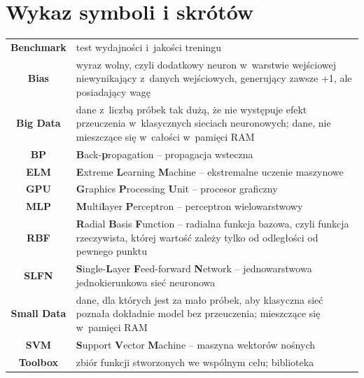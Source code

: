 \documentclass[pl]{minipw} %
\begin{document}
\chapter*{Wykaz symboli i skrótów}

\begin{tabularx}{\textwidth}{cX}
\textbf{Benchmark} & test wydajności i~jakości treningu \\
\textbf{Bias} & wyraz wolny, czyli dodatkowy neuron w~warstwie wejściowej niewynikający z~danych wejściowych, generujący zawsze +1, ale posiadający wagę \\
\textbf{Big Data} & dane z~liczbą próbek tak dużą, że nie występuje efekt przeuczenia w~klasycznych sieciach neuronowych; dane, nie mieszczące się w~całości w~pamięci RAM \\ 
\textbf{BP} & \textbf{B}ack-\textbf{p}ropagation -- propagacja wsteczna \\ 
\textbf{ELM} & \textbf{E}xtreme \textbf{L}earning \textbf{M}achine -- ekstremalne uczenie maszynowe \\ 
\textbf{GPU} & \textbf{G}raphics \textbf{P}rocessing \textbf{U}nit -- procesor graficzny \\ 
\textbf{MLP} & \textbf{M}ulti\textbf{l}ayer \textbf{P}erceptron -- perceptron wielowarstwowy \\ 
\textbf{RBF} & \textbf{R}adial \textbf{B}asis \textbf{F}unction -- radialna funkcja bazowa, czyli funkcja rzeczywista, której wartość zależy tylko od odległości od pewnego punktu \\ 
\textbf{SLFN} & \textbf{S}ingle-\textbf{L}ayer \textbf{F}eed-forward \textbf{N}etwork -- jednowarstwowa jednokierunkowa sieć neuronowa \\ 
\textbf{Small Data} & dane, dla których jest za mało próbek, aby klasyczna sieć poznała dokładnie model bez przeuczenia; mieszczące się w~pamięci RAM \\ 
\textbf{SVM} & \textbf{S}upport \textbf{V}ector \textbf{M}achine -- maszyna wektorów nośnych \\ 
\textbf{Toolbox} & zbiór funkcji stworzonych we wspólnym celu; biblioteka \\ 
\end{tabularx}


\listoffigures


\listoftables


\end{document}
